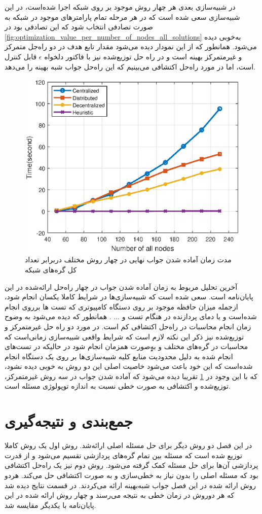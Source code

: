 	در شبیه‌سازی بعدی هر چهار روش موجود بر روی شبکه اجرا شده‌است، در این شبیه‌سازی سعی شده است که در هر مرحله تمام پارامترهای موجود در شبکه به صورت تصادفی انتخاب شود که این تصادفی بود در \cref{fig:optimization_value_per_number_of_nodes_all_solutions} به‌خوبی دیده  می‌شود. همانطور که از این نمودار دیده می‌شود مقدار تابع هدف در دو راه‌جل متمرکز و غیرمتمرکز بهینه است و در راه حل توزیع‌شده نیز با فاکتور دلخواه $\epsilon$ قابل کنترل است، اما در مورد راه‌حل اکتشافی می‌بینیم که این راه‌حل جواب شبه بهینه را می‌دهد. 
\begin{figure}[h!]
	\centerline{\includegraphics[width=12cm]{graphics/4-heuristic-dist/time_of_convergence}}
	\caption{مدت زمان آماده شدن جواب نهایی در چهار روش مختلف دربرابر تعداد کل گره‌های شبکه}
	\label{fig:time_of_convergence}
\end{figure}

	آخرین تحلیل مربوط به زمان آماده شدن جواب در چهار راه‌حل ارائه‌شده در این پایان‌نامه است. سعی شده است که شبیه‌سازی‌ها در شرایط کاملا یکسان انجام شود، ازجمله میزان حافظه موجود بر روی دستگاه کامپیوتری که تست ها برروی انجام شده‌است و یا دمای پردازنده در هنگام تست و ... . همانطور که دیده می‌شود به وضوح زمان انجام محاسبات در راه‌حل اکتشافی کم است. در مورد دو راه حل غیرمتمرکز و توزیع‌شده نیز ذکر این نکته لازم است که شرایط واقعی شبیه‌سازی زمانی‌است که محاسبات در گره‌های مختلف و بهٍٍ‌صورت همزمان انجام شود در حالیکه در تست‌های انجام شده به دلیل محدودیت منابع کلیه شبیه‌سازی‌ها بر روی یک دستگاه انجام شده‌است که این خود باعث می‌شود خاصیت اصلی این دو روش به خوبی دیده نشود، که با این وجود در \cref{fig:time_of_convergence} تقریبا دیده می‌شود که آماده شدن جواب در سه روش غیرمتمرکز، توزیع‌شده و اکتشافی به صورت خطی نسبت به اندازه توپولوژی مسئله است. 
	
	\section{جمع‌بندی و نتیجه‌گیری}
	در این فصل دو روش دیگر برای حل مسئله اصلی ارائه‌شد. روش اول یک روش کاملا توزیع شده است که مسئله بین تمام گره‌های پردازشی تقسیم می‌شود و از قدرت پردازشی آن‌ها برای حل مسئله کمک گرفته می‌شود. روش دوم نیز یک راه‌حل اکتشافی بود که مسئله اصلی را بدون نیاز به خطی‌سازی و به صورت اکتشافی حل می‌کند. هردو روش ارائه شده در این فصل جواب شبه‌بهینه ارائه می‌کردند. 
	در قسمت نتایج دیده شد که هر دوروش در زمان خطی به نتیجه می‌رسند و چهار روش ارائه شده در این پایان‌نامه با یکدیگر مقایسه شد. 

